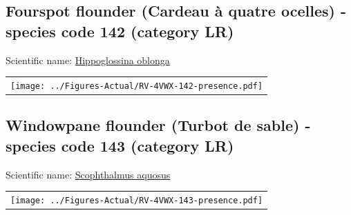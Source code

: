 \documentclass[12pt]{article}\usepackage[]{graphicx}\usepackage[]{color}
\begin{document}
\setcounter{figure}{0}

\hypertarget{sec:142}{%
\subsection{Fourspot flounder (Cardeau à quatre ocelles) - species code 142 (category LR)}\label{sec:142}}

  


Scientific name: \href{http://www.marinespecies.org/aphia.php?p=taxdetails\&id=158833}{Hippoglossina oblonga} \newline
\begin{minipage}{1.0\textwidth}
 \begin{tabular}{c}
\texttt{[image: ../Figures-Actual/RV-4VWX-142-presence.pdf]} \\ 
\end{tabular} 
\end{minipage}
\clearpage

\renewcommand\thefigure{\thesubsection\Alph{figure}}

\setcounter{figure}{0}

\hypertarget{sec:143}{%
\subsection{Windowpane flounder (Turbot de sable) - species code 143 (category LR)}\label{sec:143}}

  


Scientific name: \href{http://www.marinespecies.org/aphia.php?p=taxdetails\&id=158907}{Scophthalmus aquosus} \newline
\begin{minipage}{1.0\textwidth}
 \begin{tabular}{c}
\texttt{[image: ../Figures-Actual/RV-4VWX-143-presence.pdf]} \\ 
\end{tabular} 
\end{minipage}
\clearpage

\renewcommand\thefigure{\thesubsection\Alph{figure}}
\end{document}
